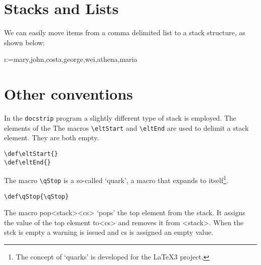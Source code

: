 \section{Stacks and Lists}
We can easily move items from a comma delimited list to a stack structure, as shown below:

\begin{teXXX}
\def\alist{mary,john,costa,george,wei,athena,maria}

\@for \i :=\alist \do{%
   \add@element{\i}
}
\end{teXXX}
%
%
%


%
%
%
%
%
%


\section{Other conventions}
\def\guardStack{}
\def\Stack{}
In the \texttt{docstrip} program a slightly different type of stack is employed. The elements of the The macros \verb+\eltStart+ and \verb+\eltEnd+ are used to delimit a stack element. They are both empty.
\begin{verbatim}
\def\eltStart{}
\def\eltEnd{}
\end{verbatim}
\def\eltStart{}
\def\eltEnd{}
The macro \verb+\qStop+ is a so-called `quark', a macro that expands to itself\footnote{The concept of `quarks' is developed for the \LaTeX3 project.}.

\begin{verbatim}
\def\qStop{\qStop}
\end{verbatim}
\def\qStop{\qStop}
The macro pop<stack><cs> `pops' the top element from the stack. It assigns the value of the top element to<cs> and removes it from <stack>. When the stck is empty a warning is issued and cs is assigned an empty value.

